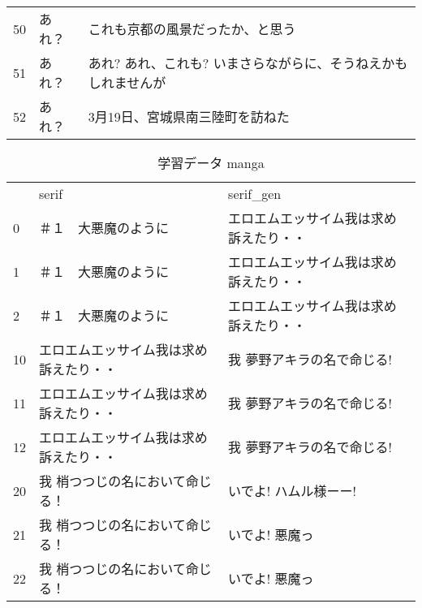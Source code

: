 \documentclass[onecolumn]{ujarticle}   %
\begin{document}
\begin{table}[tbh]
\begin{center}
\begin{tabular}{lp{5cm}p{7cm}}
    50 &
      あれ？ &
      これも京都の風景だったか、と思う \\
    51 &
      あれ？ &
      あれ? あれ、これも? いまさらながらに、そうねえかもしれませんが \\
    52 &
      あれ？ &
      3月19日、宮城県南三陸町を訪ねた \\

    \end{tabular}

    \label{tab:news}
  \end{center}
\end{table}



\begin{table}[tbh]
  \begin{center}
    \caption{学習データ manga}

    \begin{tabular}{lp{5cm}p{7cm}}

          & serif                                   & serif\_gen                              \\
      0   & ＃１　大悪魔のように                              & エロエムエッサイム我は求め訴えたり・・                     \\
      1   & ＃１　大悪魔のように                              & エロエムエッサイム我は求め訴えたり・・                     \\
      2   & ＃１　大悪魔のように                              & エロエムエッサイム我は求め訴えたり・・                     \\

      10  & エロエムエッサイム我は求め訴えたり・・                     & 我 夢野アキラの名で命じる!                          \\
      11  & エロエムエッサイム我は求め訴えたり・・                     & 我 夢野アキラの名で命じる!                          \\
      12  & エロエムエッサイム我は求め訴えたり・・                     & 我 夢野アキラの名で命じる!                          \\

      20  & 我 梢つつじの名において命じる！                        & いでよ! ハムル様ーー!                            \\
      21  & 我 梢つつじの名において命じる！                        & いでよ! 悪魔っ                                \\
      22  & 我 梢つつじの名において命じる！                        & いでよ! 悪魔っ                                \\


\end{tabular}
\end{center}
\end{table}
\end{document}
